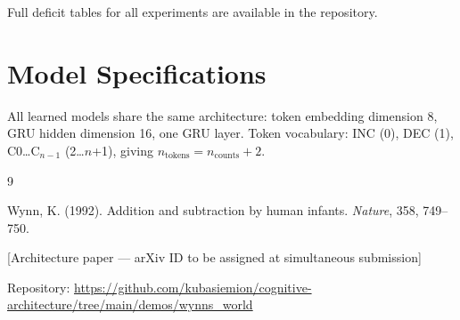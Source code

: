 \documentclass[12pt, a4paper]{article}
\begin{document}
Full deficit tables for all experiments are available in the repository.

\section{Model Specifications}
\label{app:models}

All learned models share the same architecture: token embedding dimension 8,
GRU hidden dimension 16, one GRU layer. Token vocabulary: INC (0), DEC (1),
C0\ldots C$_{n-1}$ (2\ldots$n$+1), giving $n_{\mathrm{tokens}} =
n_{\mathrm{counts}} + 2$.

\begin{center}
\end{center}

\begin{thebibliography}{9}

Wynn, K. (1992). Addition and subtraction by human infants. \textit{Nature},
358, 749--750.

[Architecture paper --- arXiv ID to be assigned at simultaneous submission]

Repository: \url{https://github.com/kubasiemion/cognitive-architecture/tree/main/demos/wynns_world}

\end{thebibliography}
\end{document}
